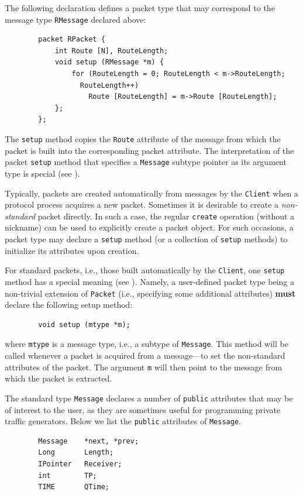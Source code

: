 \noindent
The following declaration defines a packet type that may correspond to the
message type {\tt RMessage} declared above:
\begin{verbatim}
        packet RPacket {
            int Route [N], RouteLength;
            void setup (RMessage *m) {
                for (RouteLength = 0; RouteLength < m->RouteLength;
                  RouteLength++)
                    Route [RouteLength] = m->Route [RouteLength];
            };
        };
\end{verbatim}
The {\tt setup} method copies the {\tt Route} attribute of the message
from which the packet is built into the corresponding packet attribute.
The interpretation of the packet {\tt setup} method
that specifies a {\tt Message} subtype pointer as its argument type is
special (see ).

\medskip

\noindent
Typically, packets are created automatically from messages
by the {\tt Client} when a protocol process acquires a new packet.
Sometimes it is desirable to create a {\em non-standard\/} packet directly.
In such a case, the regular {\tt create} operation (without a nickname) can be
used to explicitly create a packet object.
For such occasions, a packet type may declare a
{\tt setup} method (or a collection of {\tt setup} methods)
to initialize its attributes upon creation.

For standard packets, i.e., those built automatically by the
{\tt Client}, one {\tt setup} method has a special meaning
(see ).
Namely,
a user-defined packet type being a non-trivial extension of
{\tt Packet} (i.e., specifying some additional attributes) {\bf must} declare
the following setup method:
\begin{verbatim}
        void setup (mtype *m);
\end{verbatim}
where {\tt mtype} is a message type, i.e., a subtype of {\tt Message}.
This method will be called whenever a packet is acquired from a message---to
set the non-standard attributes of the packet.
The argument {\tt m} will then point to the message from which the packet
is extracted.

The standard type {\tt Message} declares a number of {\tt public}
attributes that may be of interest to the user, as they are sometimes
useful for programming private traffic generators.
Below we list the {\tt public} attributes of {\tt Message}.
\begin{verbatim}
        Message    *next, *prev;
        Long       Length;
        IPointer   Receiver;
        int        TP;
        TIME       QTime;
\end{verbatim}

